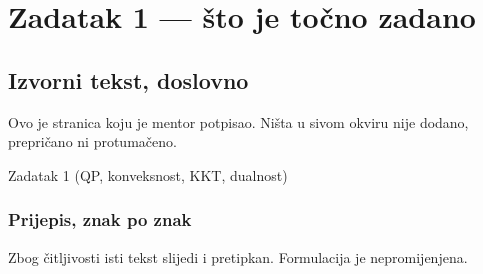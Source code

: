 \chapter{Zadatak 1 --- što je točno zadano}
\label{ch:z1-zadatak}

\section{Izvorni tekst, doslovno}
\label{sec:z1-izvorni}

Ovo je stranica koju je mentor potpisao. Ništa u sivom okviru nije dodano,
prepričano ni protumačeno.

\begin{zadatak}{Zadatak 1 (QP, konveksnost, KKT, dualnost)}
\end{zadatak}

\subsection{Prijepis, znak po znak}

Zbog čitljivosti isti tekst slijedi i pretipkan. Formulacija je nepromijenjena.

